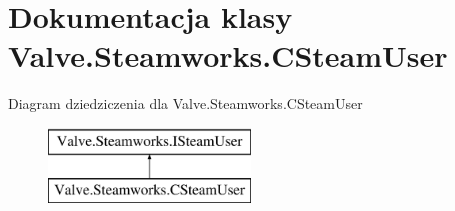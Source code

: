 \hypertarget{class_valve_1_1_steamworks_1_1_c_steam_user}{}\section{Dokumentacja klasy Valve.\+Steamworks.\+C\+Steam\+User}
\label{class_valve_1_1_steamworks_1_1_c_steam_user}
Diagram dziedziczenia dla Valve.\+Steamworks.\+C\+Steam\+User\begin{figure}[H]
\begin{center}
\leavevmode
\includegraphics[height=2.000000cm]{class_valve_1_1_steamworks_1_1_c_steam_user}
\end{center}
\end{figure}
